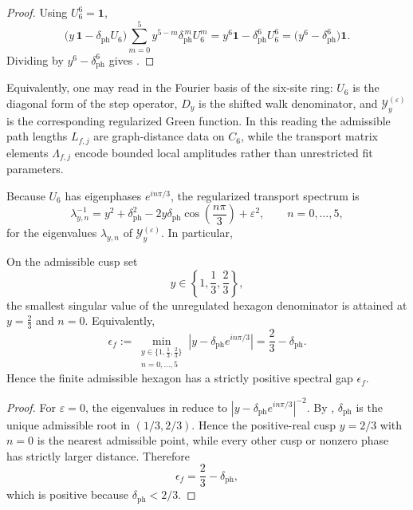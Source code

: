 \begin{proof}
Using $U_6^6=\mathbf 1$,
\[
\bigl(y\,\mathbf 1-\delta_{\mathrm{ph}}U_6\bigr)
\sum_{m=0}^{5}y^{5-m}\delta_{\mathrm{ph}}^{\,m}U_6^m
=
y^6\mathbf 1-\delta_{\mathrm{ph}}^6U_6^6
=
\bigl(y^6-\delta_{\mathrm{ph}}^6\bigr)\mathbf 1.
\]
Dividing by $y^6-\delta_{\mathrm{ph}}^6$ gives .
\end{proof}

Equivalently, one may read  in the Fourier basis of the six-site ring: $U_6$ is the diagonal form of the step operator, $D_y$ is the shifted walk denominator, and $\mathcal Y_y^{(\varepsilon)}$ is the corresponding regularized Green function. In this reading the admissible path lengths $L_{f,j}$ are graph-distance data on $C_6$, while the transport matrix elements $\Lambda_{f,j}$ encode bounded local amplitudes rather than unrestricted fit parameters.

Because $U_6$ has eigenphases $e^{in\pi/3}$, the regularized transport spectrum is
\begin{equation}
\label{eq:transport-spectrum}
\lambda_{y,n}^{-1}
=
y^2+\delta_{\mathrm{ph}}^2-2y\delta_{\mathrm{ph}}\cos\!\left(\frac{n\pi}{3}\right)+\varepsilon^2,
\qquad
n=0,\dots,5,
\end{equation}
for the eigenvalues $\lambda_{y,n}$ of $\mathcal Y_y^{(\varepsilon)}$. In particular,
\begin{lemma}
\label{lem:finite-admissible-hexagon-gap}
On the admissible cusp set
\[
y\in\left\{1,\frac13,\frac23\right\},
\]
the smallest singular value of the unregulated hexagon denominator is attained at $y=\frac23$ and $n=0$. Equivalently,
\[
\epsilon_f
:=
\min_{\substack{y\in\{1,\frac13,\frac23\}\\ n=0,\dots,5}}
\left|y-\delta_{\mathrm{ph}}e^{in\pi/3}\right|
=
\frac23-\delta_{\mathrm{ph}}.
\]
Hence the finite admissible hexagon has a strictly positive spectral gap $\epsilon_f$.
\end{lemma}

\begin{proof}
For $\varepsilon=0$, the eigenvalues in  reduce to
$|y-\delta_{\mathrm{ph}}e^{in\pi/3}|^{-2}$. By ,
$\delta_{\mathrm{ph}}$ is the unique admissible root in $(1/3,2/3)$. Hence the positive-real cusp
$y=2/3$ with $n=0$ is the nearest admissible point, while every other cusp or nonzero phase has
strictly larger distance. Therefore
\[
\epsilon_f=\frac23-\delta_{\mathrm{ph}},
\]
which is positive because $\delta_{\mathrm{ph}}<2/3$.
\end{proof}

